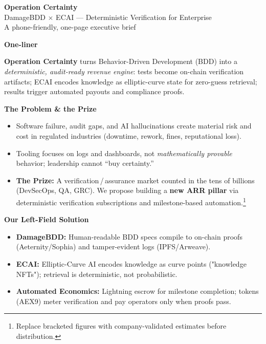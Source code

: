 \documentclass[11pt]{article}
\newcommand{\headline}[1]{\noindent\colorbox[HTML]{F2F4F7}{\parbox{\dimexpr\linewidth-2\fboxsep\relax}{\vspace{2pt}\textbf{#1}\vspace{2pt}}}}
\begin{document}
\begin{center}
    {\LARGE\bfseries Operation Certainty}\\[2pt]
    {\large DamageBDD $\times$ ECAI — Deterministic Verification for Enterprise}\vspace{0.5em}\\
    {\small A phone-friendly, one-page executive brief}
\end{center}
\vspace{0.5em}

\headline{One-liner}\vspace{0.25em}
\noindent\textbf{Operation Certainty} turns Behavior-Driven Development (BDD) into a \emph{deterministic, audit-ready revenue engine}: tests become on-chain verification artifacts; ECAI encodes knowledge as elliptic-curve state for zero-guess retrieval; results trigger automated payouts and compliance proofs.

\vspace{0.5em}
\headline{The Problem \& the Prize}\vspace{0.25em}
\begin{itemize}
  \item Software failure, audit gaps, and AI hallucinations create material risk and cost in regulated industries (downtime, rework, fines, reputational loss).\\
  \item Tooling focuses on logs and dashboards, not \emph{mathematically provable} behavior; leadership cannot “buy certainty.”\\
  \item \textbf{The Prize:} A verification\,/\,assurance market counted in the tens of billions (DevSecOps, QA, GRC). We propose building a \textbf{new ARR pillar} via deterministic verification subscriptions and milestone-based automation.\footnote{Replace bracketed figures with company-validated estimates before distribution.}
\end{itemize}

\vspace{0.25em}
\headline{Our Left-Field Solution}\vspace{0.25em}
\begin{itemize}
  \item \textbf{DamageBDD:} Human-readable BDD specs compile to on-chain proofs (Aeternity/Sophia) and tamper-evident logs (IPFS/Arweave).\\
  \item \textbf{ECAI:} Elliptic-Curve AI encodes knowledge as curve points ("knowledge NFTs"); retrieval is deterministic, not probabilistic.\\
  \item \textbf{Automated Economics:} Lightning escrow for milestone completion; tokens (AEX9) meter verification and pay operators only when proofs pass.
\end{itemize}
\end{document}
